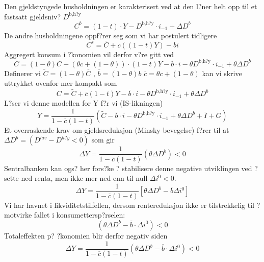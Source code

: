\documentclass[a4paper,notitlepage]{article}
\begin{document}
Den gjeldstyngede husholdningen er karakterisert ved at den l?ner helt opp til et fastsatt gjeldsniv? $D^{\text{b,h?y}}$
\begin{equation*}
C^{b}= (1-t)\cdot Y-D^{\text{b,h?y}}\cdot i_{-1}+\Delta D^{b}
\end{equation*}
De andre husholdningene oppf?rer seg som vi har postulert tidligere
\begin{equation*}
C^{s}=\overline{C}+c((1-t)Y)-bi
\end{equation*}
Aggregert konsum i ?konomien vil derfor v?re gitt ved
\begin{equation*}
C=(1-\theta)\overline{C}+(\theta c+(1-\theta))\cdot(1-t)Y-\overline{b}\cdot i - \theta D^{\text{b,h?y}}\cdot i_{-1}+ \theta\Delta D^{b} \end{equation*}
 Definerer vi $ \tilde {C}=(1-\theta)\overline{C} \text{ , } \overline{b}=(1-\theta)b$  $\overline{c}=\theta c+(1-\theta)$ kan vi skrive uttrykket ovenfor mer kompakt som
\begin{equation*}
C=\tilde{C}+\overline{c}(1-t)Y-\overline{b}\cdot i - \theta D^{\text{b,h?y}}\cdot i_{-1}+ \theta\Delta D^{b}
\end{equation*}
L?ser vi denne modellen for Y f?r vi (IS-likningen) \\
\begin{equation*}
Y=\frac{1}{1-\overline{c}(1-t)}(\tilde{C}-\overline{b}\cdot i - \theta D^{\text{b,h?y} }\cdot i_{-1}+ \theta\Delta D^{b}+\overline{I}+G)
\end{equation*}
Et overraskende krav om gjeldsreduksjon (Minsky-bevegelse) f?rer til at $\Delta D^{b} =(D^{lav}-D^{h?y}<0)$ som gir
\begin{equation*}
\Delta Y=\frac{1}{1-\overline{c}(1-t)}( \theta\Delta D^{b})<0
\end{equation*}
Sentralbanken kan ogs? her fors?ke ? stabilisere denne negative utviklingen ved ? sette ned renta, men ikke mer ned enn til null $\Delta i ^{0}<0$.
\begin{equation*}
\Delta Y=\frac{1}{1-\overline{c}(1-t)}\left[ \theta\Delta D^{b}-\overline{b} \Delta i^{0} \right]
\end{equation*}
Vi har havnet i likviditetstilfellen, dersom rentereduksjon ikke er tilstrekkelig til ? motvirke fallet i konsumettersp?rselen:
\begin{equation*}
\left( \theta\Delta D^{b}-\overline{b}\cdot \Delta i^{0} \right)<0
\end{equation*}
Totaleffekten p? ?konomien blir derfor negativ siden
\begin{equation*}
\Delta Y=\frac{1}{1-\overline{c}(1-t)}( \theta\Delta D^{b}-\overline{b}\cdot \Delta i ^{0})<0
\end{equation*}
\end{document}
